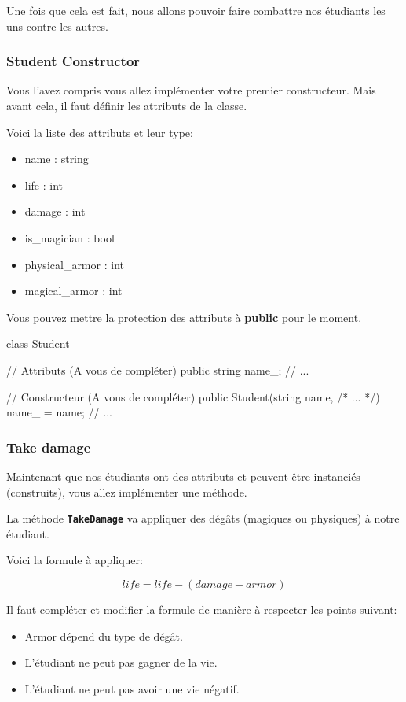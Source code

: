 Une fois que cela est fait, nous allons pouvoir faire combattre nos étudiants les uns
contre les autres.

\subsubsection{Student Constructor}

Vous l'avez compris vous allez implémenter votre premier constructeur. 
Mais avant cela, il faut définir les attributs de la classe.

Voici la liste des attributs et leur type:

\begin{itemize}
\item name : string
\item life : int
\item damage : int
\item is\_magician : bool
\item physical\_armor : int
\item magical\_armor : int\\
\end{itemize}

Vous pouvez mettre la protection des attributs à \textbf{public} pour le moment.

\begin{code}
class Student
{
	// Attributs (A vous de compléter)
    public string name_;
    // ...
    
    // Constructeur (A vous de compléter)
    public Student(string name, /* ... */)
    {
    	name_ = name;
        // ...
    }
}
\end{code}

\subsubsection{Take damage}

Maintenant que nos étudiants ont des attributs et peuvent être instanciés (construits), vous allez implémenter une méthode. 

La méthode \textbf{\texttt{TakeDamage}} va appliquer des dégâts (magiques ou physiques) à notre étudiant.

Voici la formule à appliquer:

$$
life = life - (damage - armor)
$$

Il faut compléter et modifier la formule de manière à respecter les points suivant:

\begin{itemize}
\item Armor dépend du type de dégât.
\item L'étudiant ne peut pas gagner de la vie.
\item L'étudiant ne peut pas avoir une vie négatif.
\end{itemize}


